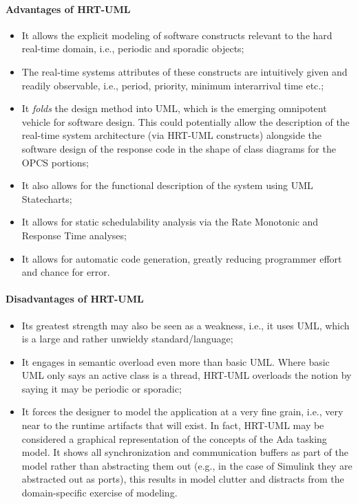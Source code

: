 \paragraph{Advantages of HRT-UML}
\begin{itemize}
\item{It allows the explicit modeling of software constructs relevant
  to the hard real-time domain, i.e., periodic and sporadic objects;}
\item{The real-time systems attributes of these constructs are
  intuitively given and readily observable, i.e., period, priority,
  minimum interarrival time etc.;}
\item{It \emph{folds} the design method into UML, which is the
  emerging omnipotent vehicle for software design. This could
  potentially allow the description of the real-time system
  architecture (via HRT-UML constructs) alongside the software design
  of the response code in the shape of class diagrams for the OPCS
  portions;}
\item{It also allows for the functional description of the system
  using UML Statecharts;}
\item{It allows for static schedulability analysis via the Rate
  Monotonic and Response Time analyses;}
\item{It allows for automatic code generation, greatly reducing
  programmer effort and chance for error.}
\end{itemize}

\paragraph{Disadvantages of HRT-UML}
\begin{itemize}
\item{Its greatest strength may also be seen as a weakness, i.e., it
  uses UML, which is a large and rather unwieldy standard/language;}
\item{It engages in semantic overload even more than basic UML. Where
  basic UML only says an active class is a thread, HRT-UML overloads
  the notion by saying it may be periodic or sporadic;}
\item{It forces the designer to model the application at a very fine
  grain, i.e., very near to the runtime artifacts that will exist. In
  fact, HRT-UML may be considered a graphical representation of the
  concepts of the Ada tasking model. It shows all synchronization and
  communication buffers as part of the model rather than abstracting
  them out (e.g., in the case of Simulink they are abstracted out as
  ports), this results in model clutter and distracts from the
  domain-specific exercise of modeling.}
\end{itemize}

